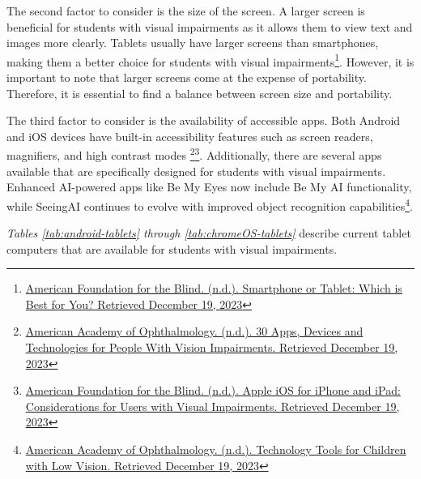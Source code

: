 The second factor to consider is the size of the screen. A larger screen is beneficial for students with visual impairments as it allows them to view text and images more clearly. Tablets usually have larger screens than smartphones, making them a better choice for students with visual impairments\footnote{\raggedright \href{https://www.afb.org/blindness-and-low-vision/using-technology/cell-phones-tablets-mobile/smartphone-or-tablet-which}{American Foundation for the Blind. (n.d.). Smartphone or Tablet: Which is Best for You? Retrieved December 19, 2023}}. However, it is important to note that larger screens come at the expense of portability. Therefore, it is essential to find a balance between screen size and portability.

The third factor to consider is the availability of accessible apps. Both Android and iOS devices have built-in accessibility features such as screen readers, magnifiers, and high contrast modes \footnote{\raggedright \href{https://www.aao.org/eye-health/tips-prevention/low-vision-impairment-apps-tech-assistive-devices }{American Academy of Ophthalmology. (n.d.). 30 Apps, Devices and Technologies for People With Vision Impairments. Retrieved December 19, 2023}}\footnote{\raggedright \href{https://www.afb.org/blindness-and-low-vision/using-technology/cell-phones-tablets-mobile/apple-ios-iphone-and-ipad }{American Foundation for the Blind. (n.d.). Apple iOS for iPhone and iPad: Considerations for Users with Visual Impairments. Retrieved December 19, 2023}}. Additionally, there are several apps available that are specifically designed for students with visual impairments. Enhanced AI-powered apps like Be My Eyes now include Be My AI functionality, while SeeingAI continues to evolve with improved object recognition capabilities\footnote{\raggedright \href{https://www.aao.org/eye-health/tips-prevention/technology-apps-devices-children-blind-low-vision}{American Academy of Ophthalmology. (n.d.). Technology Tools for Children with Low Vision. Retrieved December 19, 2023}}.

\emph{Tables \ref{tab:android-tablets} through \ref{tab:chromeOS-tablets}} describe current tablet computers that are available for students with visual impairments.


